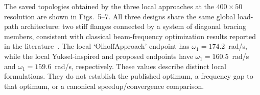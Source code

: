 The saved topologies obtained by the three local approaches at the $400{\times}50$
resolution are shown in Figs.~5--7. All three designs share the same global
load-path architecture: two stiff flanges connected by a system of diagonal
bracing members, consistent with classical beam-frequency optimization results
reported in the literature~\cite{Du2007,Yuksel2025}. The local
`OlhoffApproach' endpoint has $\omega_1 = 174.2$~rad/s, while the local
Yuksel-inspired and proposed endpoints have $\omega_1 = 160.5$~rad/s and
$\omega_1 = 159.6$~rad/s, respectively. These values describe distinct local
formulations. They do not establish the published optimum, a frequency gap to
that optimum, or a canonical speedup/convergence comparison.
